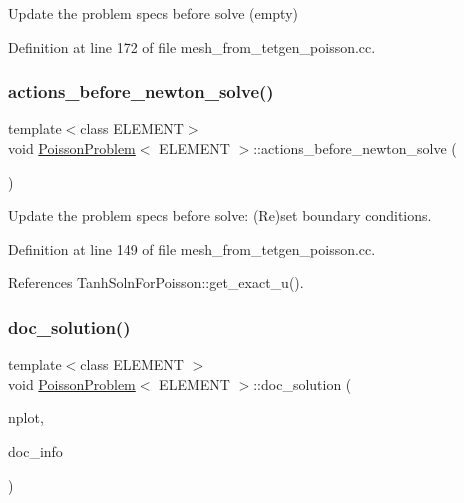 Update the problem specs before solve (empty) 



Definition at line 172 of file mesh\+\_\+from\+\_\+tetgen\+\_\+poisson.\+cc.

\mbox{\label{classPoissonProblem_a398608a5ff73b74c5a387b3f794c58df}} 
\subsubsection{\texorpdfstring{actions\+\_\+before\+\_\+newton\+\_\+solve()}{actions\_before\_newton\_solve()}}
{\footnotesize\ttfamily template$<$class E\+L\+E\+M\+E\+NT$>$ \\
void \hyperlink{classPoissonProblem}{Poisson\+Problem}$<$ E\+L\+E\+M\+E\+NT $>$\+::actions\+\_\+before\+\_\+newton\+\_\+solve (\begin{DoxyParamCaption}{ }\end{DoxyParamCaption})\hspace{0.3cm}{\ttfamily [inline]}}



Update the problem specs before solve\+: (Re)set boundary conditions. 



Definition at line 149 of file mesh\+\_\+from\+\_\+tetgen\+\_\+poisson.\+cc.



References Tanh\+Soln\+For\+Poisson\+::get\+\_\+exact\+\_\+u().

\mbox{\label{classPoissonProblem_ab72b17470b4104609b28a64021cb3779}} 
\subsubsection{\texorpdfstring{doc\+\_\+solution()}{doc\_solution()}}
{\footnotesize\ttfamily template$<$class E\+L\+E\+M\+E\+NT $>$ \\
void \hyperlink{classPoissonProblem}{Poisson\+Problem}$<$ E\+L\+E\+M\+E\+NT $>$\+::doc\+\_\+solution (\begin{DoxyParamCaption}\item[{const unsigned \&}]{nplot,  }\item[{Doc\+Info \&}]{doc\+\_\+info }\end{DoxyParamCaption})}



